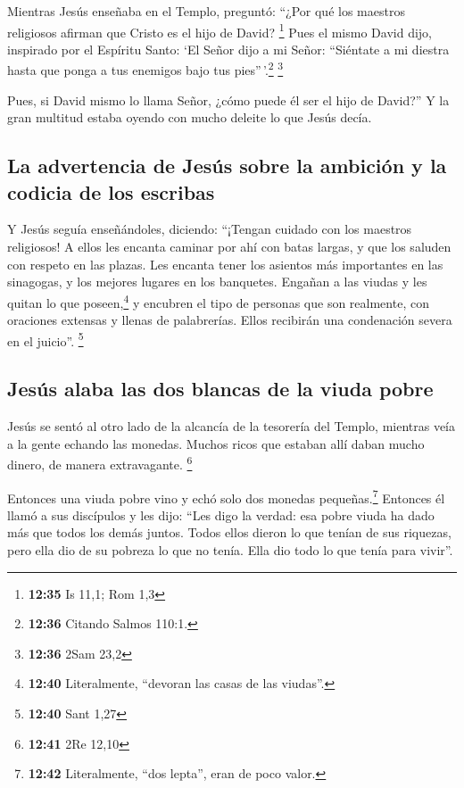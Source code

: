  Mientras Jesús enseñaba en el Templo, preguntó: ``¿Por
qué los maestros religiosos afirman que Cristo es el hijo de David?
\footnote{\textbf{12:35} Is 11,1; Rom 1,3}  Pues el mismo
David dijo, inspirado por el Espíritu Santo: `El Señor dijo a mi Señor:
``Siéntate a mi diestra hasta que ponga a tus enemigos bajo tus
pies''\,'.\footnote{\textbf{12:36} Citando Salmos 110:1.} \footnote{\textbf{12:36}
  2Sam 23,2}

 Pues, si David mismo lo llama Señor, ¿cómo puede él ser
el hijo de David?'' Y la gran multitud estaba oyendo con mucho deleite
lo que Jesús decía.

\hypertarget{la-advertencia-de-jesuxfas-sobre-la-ambiciuxf3n-y-la-codicia-de-los-escribas}{%
\subsection{La advertencia de Jesús sobre la ambición y la codicia de
los
escribas}\label{la-advertencia-de-jesuxfas-sobre-la-ambiciuxf3n-y-la-codicia-de-los-escribas}}

 Y Jesús seguía enseñándoles, diciendo: ``¡Tengan cuidado
con los maestros religiosos! A ellos les encanta caminar por ahí con
batas largas, y que los saluden con respeto en las plazas.
 Les encanta tener los asientos más importantes en las
sinagogas, y los mejores lugares en los banquetes. 
Engañan a las viudas y les quitan lo que poseen,\footnote{\textbf{12:40}
  Literalmente, ``devoran las casas de las viudas''.} y encubren el tipo
de personas que son realmente, con oraciones extensas y llenas de
palabrerías. Ellos recibirán una condenación severa en el juicio''.
\footnote{\textbf{12:40} Sant 1,27}

\hypertarget{jesuxfas-alaba-las-dos-blancas-de-la-viuda-pobre}{%
\subsection{Jesús alaba las dos blancas de la viuda
pobre}\label{jesuxfas-alaba-las-dos-blancas-de-la-viuda-pobre}}

 Jesús se sentó al otro lado de la alcancía de la
tesorería del Templo, mientras veía a la gente echando las monedas.
Muchos ricos que estaban allí daban mucho dinero, de manera
extravagante. \footnote{\textbf{12:41} 2Re 12,10}

 Entonces una viuda pobre vino y echó solo dos monedas
pequeñas.\footnote{\textbf{12:42} Literalmente, ``dos lepta'', eran de
  poco valor.}  Entonces él llamó a sus discípulos y les
dijo: ``Les digo la verdad: esa pobre viuda ha dado más que todos los
demás juntos.  Todos ellos dieron lo que tenían de sus
riquezas, pero ella dio de su pobreza lo que no tenía. Ella dio todo lo
que tenía para vivir''.

